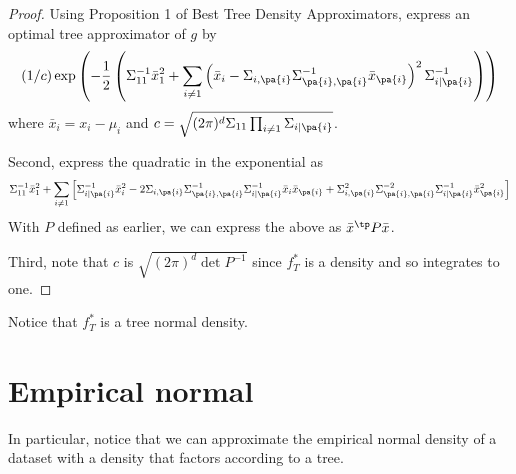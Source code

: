 \begin{proof}Using Proposition 1 of Best Tree Density Approximators, express an optimal tree approximator of $g$ by
\[
(1/c)
\exp\left(
-\frac{1}{2}
\left(
\Sigma _{11}^{-1}\bar{x}_1^2 +
\sum_{i \neq 1}
\left(\bar{x}_i - \Sigma _{i,\pa{i}}\Sigma _{\pa{i},\pa{i}}^{-1}\bar{x}_{\pa{i}}\right)^2\Sigma _{i\mid\pa{i}}^{-1}
\right)
\right)
\]
where $\bar{x}_i = x_i - \mu _i$ and $c = \sqrt{(2\pi )^d\Sigma _{11} \prod_{i \neq 1} \Sigma _{i \mid \pa{i}}}$.

Second, express the quadratic in the exponential as
\[
\Sigma _{11}^{-1}\bar{x}_1^2 +
\sum_{i \neq 1}
\left[
\Sigma _{i\mid\pa{i}}^{-1}
\bar{x}_i^2
-
2
\Sigma _{i,\pa{i}}\Sigma _{\pa{i},\pa{i}}^{-1}\Sigma _{i\mid\pa{i}}^{-1}
\bar{x}_i\bar{x}_{\pa{i}}
+
\Sigma _{i,\pa{i}}^2\Sigma _{\pa{i},\pa{i}}^{-2}\Sigma _{i\mid\pa{i}}^{-1}
\bar{x}_{\pa{i}}^2
\right]
\]
With $P$ defined as earlier, we can express the above as $\bar{x}^{\tp} P \bar{x}$.



Third, note that $c$ is $\sqrt{(2\pi )^d\det P^{-1}}$ since $f^*_T$ is a density and so integrates to one.
\end{proof}
Notice that $f^*_T$ is a tree normal density.

\section*{Empirical normal}

In particular, notice that we can approximate the empirical normal density of a dataset with a density that factors according to a tree.
